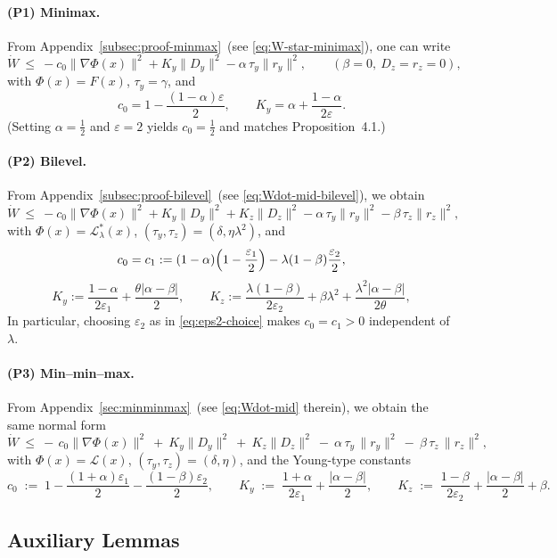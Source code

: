 \documentclass{article}
\newcommand{\1}{\mathbf{1}}
\begin{document}
\paragraph{(P1) Minimax.}
From Appendix~\ref{subsec:proof-minmax}~(see \eqref{eq:W-star-minimax}), one can write
\[
\dot W \ \le\ -c_0\|\nabla\Phi(x)\|^2 + K_y\|D_y\|^2 - \alpha\,\tau_y\|r_y\|^2,
\qquad(\beta=0,\ D_z=r_z=0),
\]
with $\Phi(x)=F(x)$, $\tau_y=\gamma$, and
\[
c_0 = 1-\frac{(1-\alpha)\varepsilon}{2},
\qquad
K_y = \alpha+\frac{1-\alpha}{2\varepsilon}.
\]
(Setting $\alpha=\tfrac12$ and $\varepsilon=2$ yields $c_0=\tfrac12$ and matches Proposition~4.1.)

\paragraph{(P2) Bilevel.}
From Appendix~\ref{subsec:proof-bilevel}~(see \eqref{eq:Wdot-mid-bilevel}), we obtain
\[
\dot W \ \le\ -c_0\|\nabla\Phi(x)\|^2 + K_y\|D_y\|^2 + K_z\|D_z\|^2
-\alpha\,\tau_y\|r_y\|^2-\beta\,\tau_z\|r_z\|^2,
\]
with $\Phi(x)=\mathcal L_\lambda^*(x)$, $(\tau_y,\tau_z)=(\delta,\eta\lambda^2)$, and
\[
c_0=c_1 := (1-\alpha)\Bigl(1-\frac{\varepsilon_1}{2}\Bigr)-\lambda(1-\beta)\frac{\varepsilon_2}{2},
\]
\[
K_y := \frac{1-\alpha}{2\varepsilon_1}+\frac{\theta|\alpha-\beta|}{2},
\qquad
K_z := \frac{\lambda(1-\beta)}{2\varepsilon_2}+\beta\lambda^{2}
+\frac{\lambda^2|\alpha-\beta|}{2\theta},
\]
In particular, choosing $\varepsilon_2$ as in \eqref{eq:eps2-choice} makes $c_0=c_1>0$ independent of $\lambda$.

\paragraph{(P3) Min--min--max.}
From Appendix~\ref{sec:minminmax}~(see \eqref{eq:Wdot-mid} therein), we obtain the same normal form
\[
\dot W
\ \le\
-\,c_0\|\nabla \Phi(x)\|^2
\ +\ K_y\|D_y\|^2
\ +\ K_z\|D_z\|^2
\ -\ \alpha\,\tau_y\,\|r_y\|^2
\ -\ \beta\,\tau_z\,\|r_z\|^2,
\]
with $\Phi(x)=\mathcal L(x)$, $(\tau_y,\tau_z)=(\delta,\eta)$, and the Young-type constants
\[
c_0 \;:=\; 1-\frac{(1+\alpha)\varepsilon_1}{2}-\frac{(1-\beta)\varepsilon_2}{2},
\qquad
K_y \;:=\; \frac{1+\alpha}{2\varepsilon_1}+\frac{|\alpha-\beta|}{2},
\qquad
K_z \;:=\; \frac{1-\beta}{2\varepsilon_2}+\frac{|\alpha-\beta|}{2}+\beta.
\]



\clearpage
\subsection{Auxiliary Lemmas}\label{subsec:aux-minmax}
\end{document}

